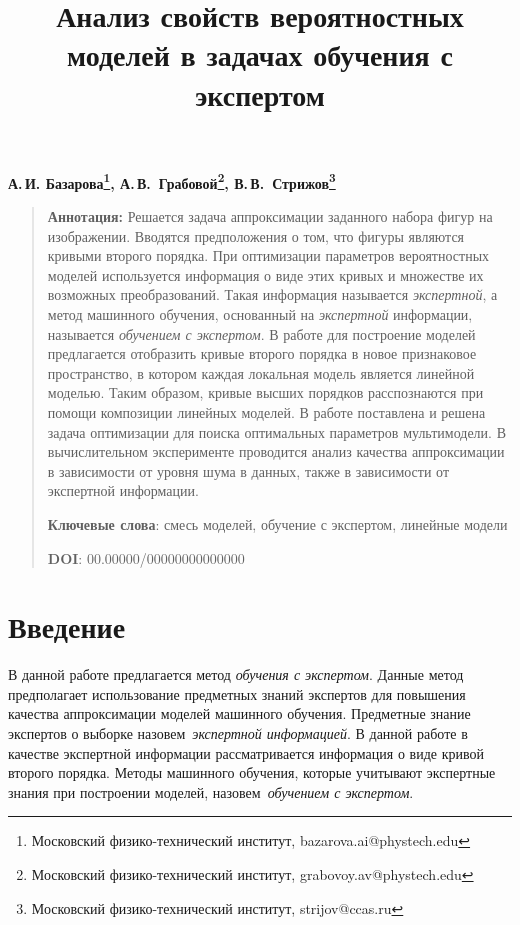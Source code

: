 \documentclass[12pt, twoside]{article}
\numberwithin{equation}{section}
\begin{document}
\title{\bf Анализ свойств вероятностных моделей в задачах обучения с экспертом}
\date{}
\author{}
\maketitle

\begin{center}
\bf
А.\,И. Базарова\footnote{Московский физико-технический институт, bazarova.ai@phystech.edu}, А.\,В.~Грабовой\footnote{Московский физико-технический институт, grabovoy.av@phystech.edu}, В.\,В.~Стрижов\footnote{Московский физико-технический институт, strijov@ccas.ru}

\end{center}

{\centering\begin{quote}
\textbf{Аннотация:} Решается задача аппроксимации заданного набора фигур на изображении. Вводятся предположения о том, что фигуры являются кривыми второго порядка. При оптимизации параметров вероятностных моделей используется информация о виде этих кривых и множестве их возможных преобразований. Такая информация называется \textit{экспертной}, а метод машинного обучения, основанный на \textit{экспертной} информации, называется \textit{обучением с экспертом}.
В работе для построение моделей предлагается отобразить кривые второго порядка в новое признаковое пространство, в котором каждая локальная модель является линейной моделью. Таким образом, кривые высших порядков расспознаются при помощи композиции линейных моделей. В работе поставлена и решена задача оптимизации для поиска оптимальных параметров мультимодели.
В вычислительном эксперименте проводится анализ качества аппроксимации в зависимости от уровня шума в данных, также в зависимости от экспертной информации.
    
\smallskip
\textbf{Ключевые слова}: смесь моделей, обучение с экспертом, линейные модели

\smallskip
\textbf{DOI}: 00.00000/00000000000000
\end{quote}
}

\section{Введение}
В данной работе предлагается метод \textit{обучения с экспертом}. Данные метод предполагает использование предметных знаний экспертов для повышения качества аппроксимации моделей машинного обучения.
Предметные знание экспертов о выборке назовем~\textit{экспертной информацией}. В данной работе в качестве экспертной информации рассматривается информация о виде кривой второго порядка. Методы машинного обучения, которые учитывают экспертные знания при построении моделей, назовем~\textit{обучением с экспертом}.
\end{document}

